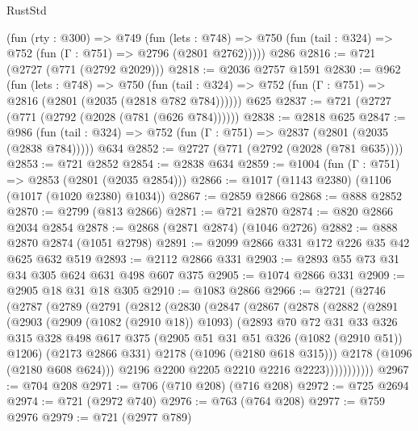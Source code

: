 \begin{lexlean}{RustStd}
\begin{coremodule}
{\begin{coremodule}
{{{{{{{{{{    (fun (rty : @300) =>
    @749
      (fun (lets : @748) =>
      @750 (fun (tail : @324) => @752 (fun (Γ : @751) => @2796 (@2801 @2762)))))
    @286
@2816 := @721 (@2727 (@771 (@2792 @2029)))
@2818 := @2036 @2757 @1591
@2830 := @962
    (fun (lets : @748) =>
    @750 (fun (tail : @324) => @752 (fun (Γ : @751) => @2816 (@2801 (@2035 (@2818 @782 @784))))))
    @625
@2837 := @721 (@2727 (@771 (@2792 (@2028 (@781 (@626 @784))))))
@2838 := @2818 @625
@2847 := @986
    (fun (tail : @324) => @752 (fun (Γ : @751) => @2837 (@2801 (@2035 (@2838 @784)))))
    @634
@2852 := @2727 (@771 (@2792 (@2028 (@781 @635))))
@2853 := @721 @2852
@2854 := @2838 @634
@2859 := @1004 (fun (Γ : @751) => @2853 (@2801 (@2035 @2854)))
@2866 := @1017 (@1143 @2380) (@1106 (@1017 (@1020 @2380) @1034))
@2867 := @2859 @2866
@2868 := @888 @2852
@2870 := @2799 (@813 @2866)
@2871 := @721 @2870
@2874 := @820 @2866 @2034 @2854
@2878 := @2868 (@2871 @2874) (@1046 @2726)
@2882 := @888 @2870 @2874 (@1051 @2798)
@2891 := @2099 @2866 @331 @172 @226 @35 @42 @625 @632 @519
@2893 := @2112 @2866 @331
@2903 := @2893 @55 @73 @31 @34 @305 @624 @631 @498 @607 @375
@2905 := @1074 @2866 @331
@2909 := @2905 @18 @31 @18 @305
@2910 := @1083 @2866
@2966 := @2721
    (@2746
      (@2787
        (@2789
          (@2791
            (@2812
              (@2830
                (@2847
                  (@2867
                    (@2878
                      (@2882
                        (@2891
                          (@2903
                            (@2909 (@1082 (@2910 @18)) @1093)
                            (@2893
                              @70
                              @72
                              @31
                              @33
                              @326
                              @315
                              @328
                              @498
                              @617
                              @375
                              (@2905 @51 @31 @51 @326 (@1082 (@2910 @51)) @1206)
                              (@2173 @2866 @331)
                              @2178
                              (@1096 (@2180 @618 @315)))
                            @2178
                            (@1096 (@2180 @608 @624)))
                          @2196
                          @2200
                          @2205
                          @2210
                          @2216
                          @2223)))))))))))
@2967 := @704 @208
@2971 := @706 (@710 @208) (@716 @208)
@2972 := @725 @2694
@2974 := @721 (@2972 @740)
@2976 := @763 (@764 @208)
@2977 := @759 @2976
@2979 := @721 (@2977 @789)
}}}}}}}}}}
\end{coremodule}}
\end{coremodule}
\end{lexlean}
